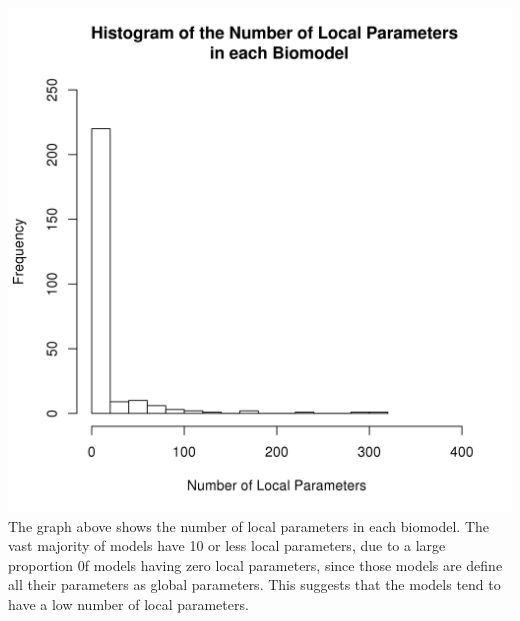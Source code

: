 \documentclass[portrait,a0paper,fontscale=0.35]{baposter}
\begin{document}
\begin{poster}
{\begin{multicols}{2}
 
 \includegraphics[trim= 1.5mm 5mm 5mm 5mm, clip, scale=0.4]{Poster-images/LocalParametersHistogram.png} 
 The graph above shows the number of local parameters in each biomodel. The vast majority of models have 10 or less local parameters, due to a large proportion 0f models having zero local parameters, since those models are define all their parameters as global parameters. This suggests that the models tend to have a low number of local parameters.
 \end{multicols}
 }
 
\end{poster}
\end{document}
